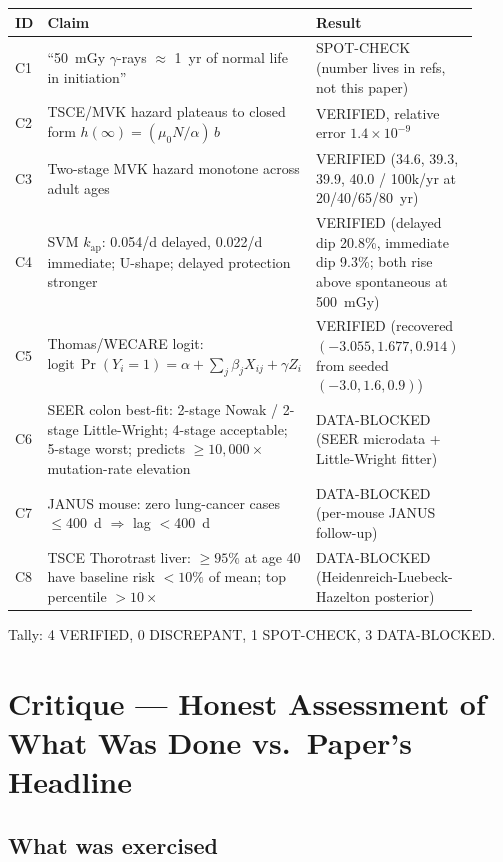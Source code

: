 \documentclass[11pt]{article}
\begin{document}
\begin{longtable}{@{}p{0.06\linewidth} p{0.5\linewidth} p{0.36\linewidth}@{}}
\toprule
ID & Claim & Result \\
\midrule
C1 & ``50~mGy $\gamma$-rays $\approx$ 1~yr of normal life in initiation'' & SPOT-CHECK (number lives in refs, not this paper) \\
C2 & TSCE/MVK hazard plateaus to closed form $h(\infty) = (\mu_0 N / \alpha)\,b$ & VERIFIED, relative error $1.4\times 10^{-9}$ \\
C3 & Two-stage MVK hazard monotone across adult ages & VERIFIED (34.6, 39.3, 39.9, 40.0 / 100k/yr at 20/40/65/80~yr) \\
C4 & SVM $k_{\mathrm{ap}}$: 0.054/d delayed, 0.022/d immediate; U-shape; delayed protection stronger & VERIFIED (delayed dip 20.8\%, immediate dip 9.3\%; both rise above spontaneous at 500~mGy) \\
C5 & Thomas/WECARE logit: $\mathrm{logit}\,\Pr(Y_i=1) = \alpha + \sum_j \beta_j X_{ij} + \gamma Z_i$ & VERIFIED (recovered $(-3.055, 1.677, 0.914)$ from seeded $(-3.0, 1.6, 0.9)$) \\
C6 & SEER colon best-fit: 2-stage Nowak / 2-stage Little-Wright; 4-stage acceptable; 5-stage worst; predicts $\geq 10{,}000\times$ mutation-rate elevation & DATA-BLOCKED (SEER microdata + Little-Wright fitter) \\
C7 & JANUS mouse: zero lung-cancer cases $\leq$400~d $\Rightarrow$ lag $<$400~d & DATA-BLOCKED (per-mouse JANUS follow-up) \\
C8 & TSCE Thorotrast liver: $\geq 95\%$ at age 40 have baseline risk $< 10\%$ of mean; top percentile $> 10\times$ & DATA-BLOCKED (Heidenreich-Luebeck-Hazelton posterior) \\
\bottomrule
\end{longtable}

Tally: 4 VERIFIED, 0 DISCREPANT, 1 SPOT-CHECK, 3 DATA-BLOCKED.

\section{Critique --- Honest Assessment of What Was Done vs.\ Paper's Headline}

\subsection{What was exercised}
\end{document}
